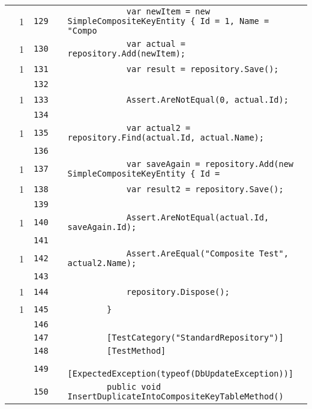 \documentclass[a4paper,10pt]{article}
\begin{document}
\begin{longtable}[l]{lrrll}
\cellcolor{green} & 1 & \verb~129~ & & \verb~            var newItem = new SimpleCompositeKeyEntity { Id = 1, Name = "Compo~\\
\cellcolor{green} & 1 & \verb~130~ & & \verb~            var actual = repository.Add(newItem);~\\
\cellcolor{green} & 1 & \verb~131~ & & \verb~            var result = repository.Save();~\\
\cellcolor{gray} &  & \verb~132~ & & \verb~~\\
\cellcolor{green} & 1 & \verb~133~ & & \verb~            Assert.AreNotEqual(0, actual.Id);~\\
\cellcolor{gray} &  & \verb~134~ & & \verb~~\\
\cellcolor{green} & 1 & \verb~135~ & & \verb~            var actual2 = repository.Find(actual.Id, actual.Name);~\\
\cellcolor{gray} &  & \verb~136~ & & \verb~~\\
\cellcolor{green} & 1 & \verb~137~ & & \verb~            var saveAgain = repository.Add(new SimpleCompositeKeyEntity { Id =~\\
\cellcolor{green} & 1 & \verb~138~ & & \verb~            var result2 = repository.Save();~\\
\cellcolor{gray} &  & \verb~139~ & & \verb~~\\
\cellcolor{green} & 1 & \verb~140~ & & \verb~            Assert.AreNotEqual(actual.Id, saveAgain.Id);~\\
\cellcolor{gray} &  & \verb~141~ & & \verb~~\\
\cellcolor{green} & 1 & \verb~142~ & & \verb~            Assert.AreEqual("Composite Test", actual2.Name);~\\
\cellcolor{gray} &  & \verb~143~ & & \verb~~\\
\cellcolor{green} & 1 & \verb~144~ & & \verb~            repository.Dispose();~\\
\cellcolor{green} & 1 & \verb~145~ & & \verb~        }~\\
\cellcolor{gray} &  & \verb~146~ & & \verb~~\\
\cellcolor{gray} &  & \verb~147~ & & \verb~        [TestCategory("StandardRepository")]~\\
\cellcolor{gray} &  & \verb~148~ & & \verb~        [TestMethod]~\\
\cellcolor{gray} &  & \verb~149~ & & \verb~        [ExpectedException(typeof(DbUpdateException))]~\\
\cellcolor{gray} &  & \verb~150~ & & \verb~        public void InsertDuplicateIntoCompositeKeyTableMethod()~\\

\end{longtable}
\end{document}
